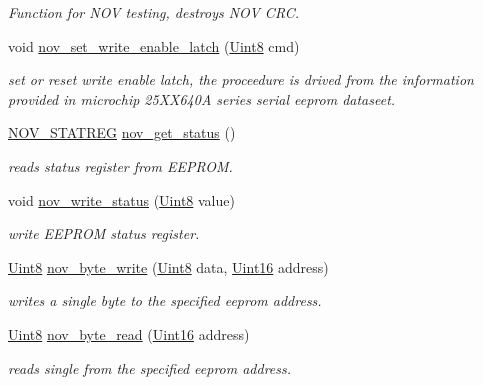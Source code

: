 \begin{DoxyCompactItemize}
\begin{DoxyCompactList}\small\item\em Function for N\+O\+V testing, destroys N\+O\+V C\+R\+C. \end{DoxyCompactList}\item 
void \hyperlink{a00029_a7b698f4b0088c4e28951c2204b7b821e}{nov\+\_\+set\+\_\+write\+\_\+enable\+\_\+latch} (\hyperlink{a00072_af84840501dec18061d18a68c162a8fa2}{Uint8} cmd)
\begin{DoxyCompactList}\small\item\em set or reset write enable latch, the proceedure is drived from the information provided in microchip 25\+X\+X640\+A series serial eeprom dataseet. \end{DoxyCompactList}\item 
\hyperlink{a00029_d0/d1c/a00605}{N\+O\+V\+\_\+\+S\+T\+A\+T\+R\+E\+G} \hyperlink{a00029_af9ccbc198ed63feb4fd6c18dd934590d}{nov\+\_\+get\+\_\+status} ()
\begin{DoxyCompactList}\small\item\em reads status register from E\+E\+P\+R\+O\+M. \end{DoxyCompactList}\item 
void \hyperlink{a00029_a495e93d64734be469f6725de24dd44e1}{nov\+\_\+write\+\_\+status} (\hyperlink{a00072_af84840501dec18061d18a68c162a8fa2}{Uint8} value)
\begin{DoxyCompactList}\small\item\em write E\+E\+P\+R\+O\+M status register. \end{DoxyCompactList}\item 
\hyperlink{a00072_af84840501dec18061d18a68c162a8fa2}{Uint8} \hyperlink{a00029_a3f47e1f5179297e173ae8508c7185632}{nov\+\_\+byte\+\_\+write} (\hyperlink{a00072_af84840501dec18061d18a68c162a8fa2}{Uint8} data, \hyperlink{a00072_a59a9f6be4562c327cbfb4f7e8e18f08b}{Uint16} address)
\begin{DoxyCompactList}\small\item\em writes a single byte to the specified eeprom address. \end{DoxyCompactList}\item 
\hyperlink{a00072_af84840501dec18061d18a68c162a8fa2}{Uint8} \hyperlink{a00029_adf5af9eb34f1cd301648dfa3c71fe392}{nov\+\_\+byte\+\_\+read} (\hyperlink{a00072_a59a9f6be4562c327cbfb4f7e8e18f08b}{Uint16} address)
\begin{DoxyCompactList}\small\item\em reads single from the specified eeprom address. \end{DoxyCompactList}\item 

\end{DoxyCompactItemize}
